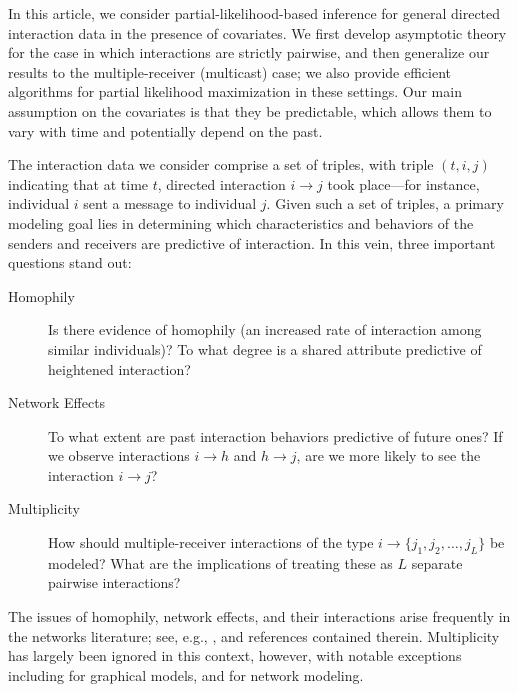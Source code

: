 \documentclass[final]{statsoc}
\begin{document}
In this article, we consider partial-likelihood-based inference for general
directed interaction data in the presence of covariates.  We first develop
asymptotic theory for the case in which interactions are strictly pairwise,
and then generalize our results to the multiple-receiver (multicast) case;
we also provide efficient algorithms for partial likelihood maximization in
these settings.  Our main assumption on the covariates is that they be
predictable, which allows them to vary with time and potentially depend on
the past.

The interaction data we consider comprise a set of triples, with triple
$(t,i,j)$ indicating that at time $t$, directed interaction
$i\rightarrow j$ took place---for instance, individual $i$ sent a message
to individual $j$.  Given such a set of triples, a primary modeling goal lies in
determining which characteristics and behaviors of the senders and
receivers are predictive of interaction.  In this vein, three important
questions stand out:

\begin{description}
    \item[Homophily] Is there evidence of homophily (an increased rate of
    interaction among similar individuals)?  To what degree is a shared
    attribute predictive of heightened interaction?

    \item[Network Effects] To what extent are past interaction behaviors predictive of future ones?
    If we observe interactions $i \to h$ and $h \to j$, are we more likely
    to see the interaction $i \to j$?

    \item[Multiplicity] How should multiple-receiver interactions of the
    type $i \rightarrow \{j_1,j_2,\ldots, j_L\}$ be modeled?  What are the
    implications of treating these as $L$ separate pairwise interactions?
\end{description}

The issues of homophily, network effects, and their interactions arise frequently in the networks literature; see, e.g., \citet{mcpherson2001birds, butts2008relational, aral2009distinguishing, snijders2010introduction}, and
references contained therein.  Multiplicity has largely been ignored in this context, however, with notable exceptions including
\citet{lunagomez2009geometric} for graphical models, and
\citet{shafiei2010mixed} for network modeling.
\end{document}
